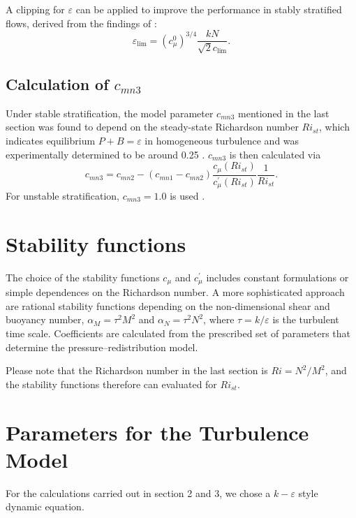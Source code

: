 A clipping for $\varepsilon$ can be applied to improve the performance in 
stably stratified flows, derived from the findings of \citep{Galperin1988}:
\begin{equation}
 \label{galperin}
 \varepsilon_{\lim} = (c_\mu^0)^{3 \slash 4} \frac{kN}{\sqrt{2} c_{\lim}}.
\end{equation}

\subsection{Calculation of $c_{mn3}$ }

Under stable stratification, the model parameter $c_{mn3}$ mentioned in the 
last section was found to depend on the steady-state Richardson number 
$Ri_{st}$, which indicates equilibrium $P + B = \varepsilon$ in homogeneous 
turbulence and was experimentally determined to be around 0.25 
\citep[][]{UmlaufBurchard2005a}. $c_{mn3}$ is then calculated via
\begin{equation}
 \label{cmn3}
 c_{mn3} = c_{mn2} - (c_{mn1} - c_{mn2}) \frac{c_\mu(Ri_{st})}{c_\mu^ \prime 
(Ri_{st})} \frac{1}{Ri_{st}}.
\end{equation}
For unstable stratification, $c_{mn3} = 1.0$ is used \citep[][]{Rodi1987}.

\section{Stability functions}

The choice of the stability functions $c_\mu$ and $c_\mu^\prime$ includes 
constant formulations or simple dependences on the Richardson number. A more 
sophisticated approach are rational stability functions depending on 
the non-dimensional shear and buoyancy number, $\alpha_M = \tau^2 M^2$ and 
$\alpha_N = \tau^2 N^2$, where $\tau = k \slash \varepsilon $ is the turbulent 
time scale. Coefficients are calculated from the prescribed set of parameters 
that determine the pressure--redistribution model.


Please note that the Richardson number in the last section is $Ri = N^2 \slash 
M^2$, and the stability functions therefore can evaluated for $Ri_{st}$.

\section{Parameters for the Turbulence Model}

For the calculations carried out in section 2 and 3, we chose a $k-\varepsilon$ 
style dynamic equation.

